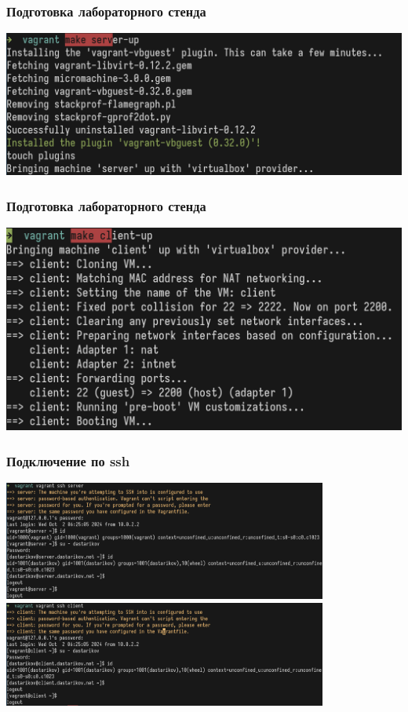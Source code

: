 \begin{frame}
\frametitle{Подготовка лабораторного стенда}
        \centering
        \includegraphics[width=\textwidth]{../images/img5.png}
\end{frame}
\begin{frame}
\frametitle{Подготовка лабораторного стенда}
        \centering
        \includegraphics[width=\textwidth]{../images/img6.png}
\end{frame}
\begin{frame}
\frametitle{Подключение по ssh}
        \centering
        \includegraphics[width=0.8\textwidth]{../images/img7.png}
        \centering
        \includegraphics[width=0.8\textwidth]{../images/img7a.png}
\end{frame}

